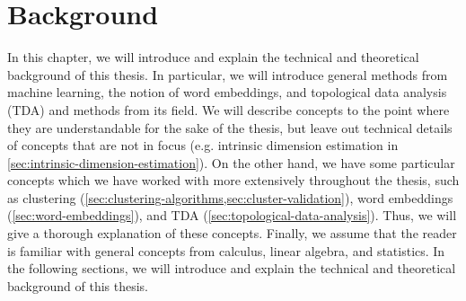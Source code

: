 \chapter{Background}
\label{chap:background}
In this chapter, we will introduce and explain the technical and theoretical background of this thesis. In particular, we will introduce general methods from machine learning, the notion of word embeddings, and topological data analysis (TDA) and methods from its field. We will describe concepts to the point where they are understandable for the sake of the thesis, but leave out technical details of concepts that are not in focus (e.g. intrinsic dimension estimation in \cref{sec:intrinsic-dimension-estimation}). On the other hand, we have some particular concepts which we have worked with more extensively throughout the thesis, such as clustering (\cref{sec:clustering-algorithms,sec:cluster-validation}), word embeddings (\cref{sec:word-embeddings}), and TDA (\cref{sec:topological-data-analysis}). Thus, we will give a thorough explanation of these concepts. Finally, we assume that the reader is familiar with general concepts from calculus, linear algebra, and statistics. In the following sections, we will introduce and explain the technical and theoretical background of this thesis.




